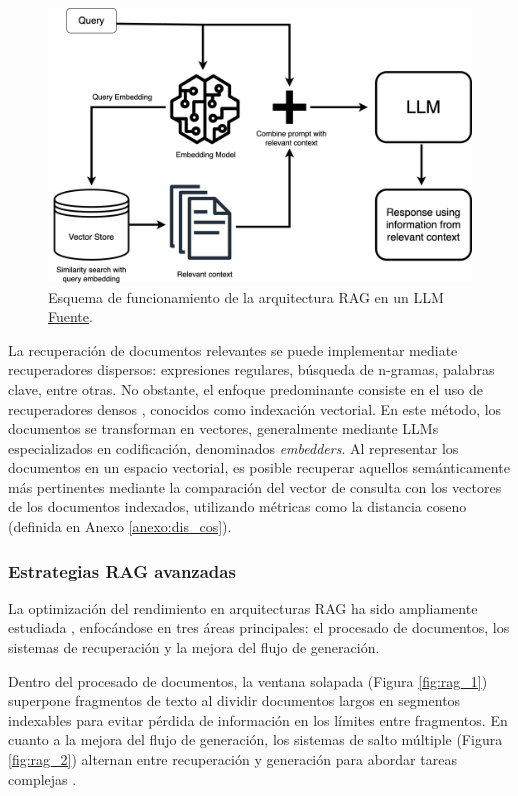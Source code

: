 \begin{figure}[hbtp]
  \centering
  \includegraphics[width=0.75\linewidth]{figures/RAG.png}
  \caption{Esquema de funcionamiento de la arquitectura RAG en un LLM \href{https://www.clarifai.com/blog/what-is-rag-retrieval-augmented-generation}{Fuente}.}
  \label{fig:rag}
\end{figure}

La recuperación de documentos relevantes se puede implementar mediate recuperadores dispersos: expresiones regulares, búsqueda de n-gramas, palabras clave, entre otras. No obstante, el enfoque predominante consiste en el uso de recuperadores densos \cite{gao_retrieval-augmented_2024}, conocidos como indexación vectorial. En este método, los documentos se transforman en vectores, generalmente mediante LLMs especializados en codificación, denominados \textit{embedders}. Al representar los documentos en un espacio vectorial, es posible recuperar aquellos semánticamente más pertinentes mediante la comparación del vector de consulta con los vectores de los documentos indexados, utilizando métricas como la distancia coseno (definida en Anexo \ref{anexo:dis_cos}).

\subsubsection{Estrategias RAG avanzadas}
\label{sec:estr_rag}
La optimización del rendimiento en arquitecturas RAG ha sido ampliamente estudiada \cite{zhu_retrieving_2021, gao_retrieval-augmented_2024}, enfocándose en tres áreas principales: el procesado de documentos, los sistemas de recuperación y la mejora del flujo de generación.

Dentro del procesado de documentos, la ventana solapada (Figura \ref{fig:rag_1}) superpone fragmentos de texto al dividir documentos largos en segmentos indexables para evitar pérdida de información en los límites entre fragmentos. En cuanto a la mejora del flujo de generación, los sistemas de salto múltiple (Figura \ref{fig:rag_2}) alternan entre recuperación y generación para abordar tareas complejas \cite{khattab_demonstrate-search-predict_2022, shao_enhancing_2023, qi-etal-2021-answering, zheng_take_2023, trivedi_interleaving_2023}.

